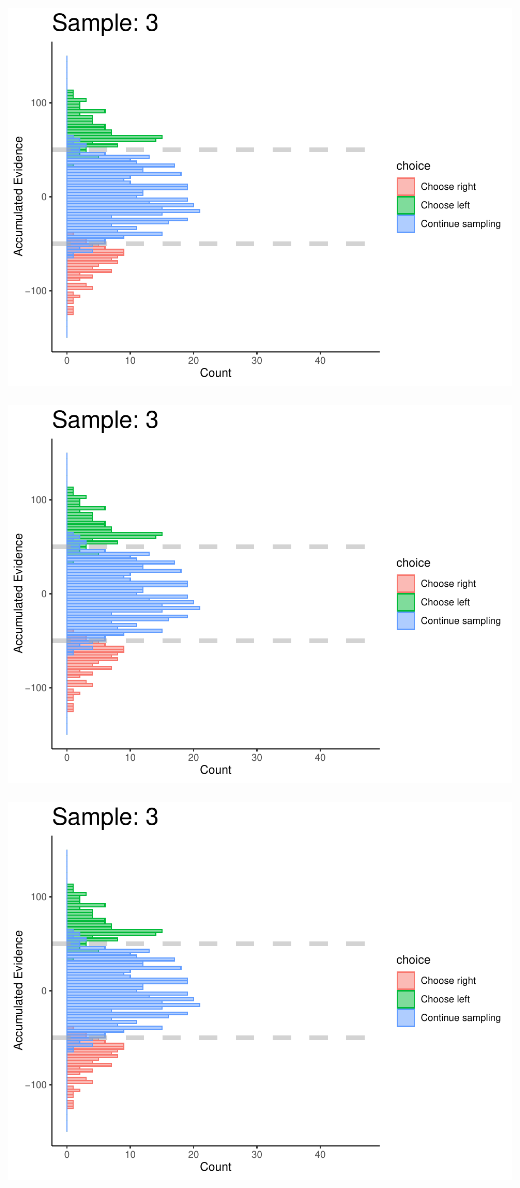 \documentclass[
]{book}
\begin{document}
\begin{center}\includegraphics[width=0.8\linewidth]{LateNightBayes_files/figure-latex/fixed_check-22} \end{center}

\begin{center}\includegraphics[width=0.8\linewidth]{LateNightBayes_files/figure-latex/fixed_check-23} \end{center}

\begin{center}\includegraphics[width=0.8\linewidth]{LateNightBayes_files/figure-latex/fixed_check-24} \end{center}
\end{document}
